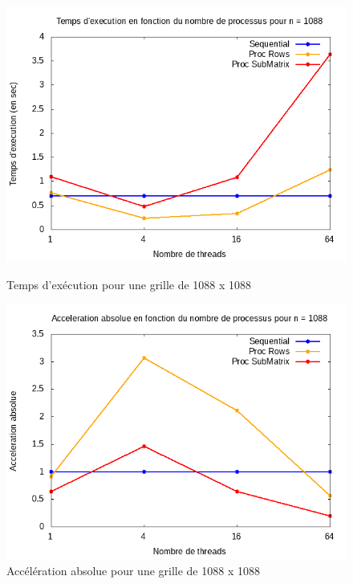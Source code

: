 \documentclass[10pt,a4paper]{article}
\begin{document}
\begin{figure}[h]
  \centering
  \begin{minipage}[b]{0.49\textwidth}
	\includegraphics[width=\textwidth]{./Time/size_1088_time.png}
    \caption{Temps d'exécution pour une grille de 1088 x 1088}
  \end{minipage}
  \hfill
  \begin{minipage}[b]{0.49\textwidth}
    \includegraphics[width=\textwidth]{./Time/size_1088_acceleration.png}
    \caption{Accélération absolue pour une grille de 1088 x 1088}
  \end{minipage}
\end{figure}
\end{document}
